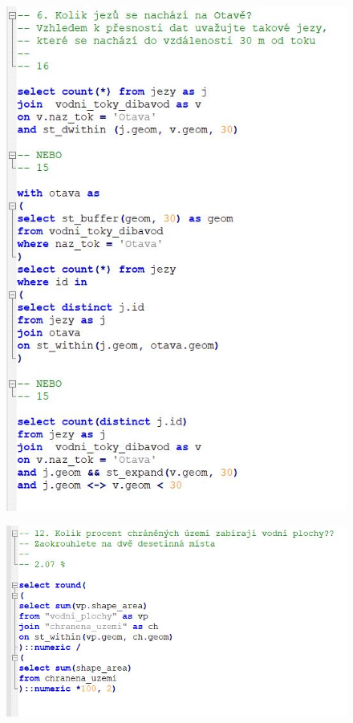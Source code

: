 \documentclass[a4paper, 12pt]{article}
\begin{document}
\begin{figure}[h!]
	\centering
	\includegraphics[width=15cm]{pictures/pd2.jpg}
\end{figure}

\clearpage 
\begin{figure}[h!]
	\centering
	\includegraphics[width=15cm]{pictures/pd4.jpg}
\end{figure}
\end{document}

